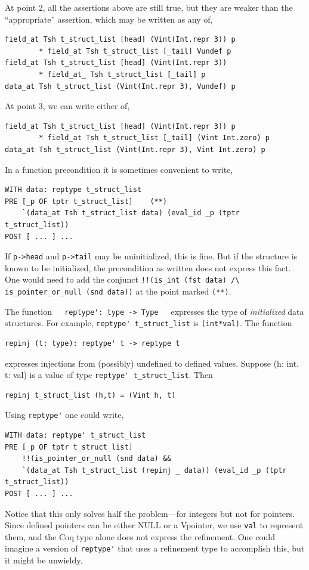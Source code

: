 \documentclass[12pt,fleqn,openany,oneside,showtrims]{memoir}
\begin{document}
At point 2, all the assertions above are still true, but
they are weaker than the ``appropriate'' assertion, which
may be written as any of,
\begin{lstlisting}
field_at Tsh t_struct_list [head] (Vint(Int.repr 3)) p
        * field_at Tsh t_struct_list [_tail] Vundef p
field_at Tsh t_struct_list [head] (Vint(Int.repr 3)) 
        * field_at_ Tsh t_struct_list [_tail] p
data_at Tsh t_struct_list (Vint(Int.repr 3), Vundef) p
\end{lstlisting}

At point 3, we can write either of,
\begin{lstlisting}
field_at Tsh t_struct_list [head] (Vint(Int.repr 3)) p 
        * field_at Tsh t_struct_list [_tail] (Vint Int.zero) p
data_at Tsh t_struct_list (Vint(Int.repr 3), Vint Int.zero) p
\end{lstlisting}


In a function precondition it is sometimes convenient to write,
\begin{lstlisting}
WITH data: reptype t_struct_list
PRE [_p OF tptr t_struct_list]    (**)  
    `(data_at Tsh t_struct_list data) (eval_id _p (tptr t_struct_list))
POST [ ... ] ...
\end{lstlisting}
If \lstinline{p->head} and 
\lstinline{p->tail} may be uninitialized, this is fine.
But if the structure is known to be initialized, the precondition
as written does not express this fact.  One would need to
add the conjunct \linebreak
\lstinline{!!(is_int (fst data) /\ is_pointer_or_null (snd data))}\linebreak
at the point marked \lstinline{(**)}.

The function~~~\lstinline{reptype': type -> Type}\ \ \ expresses
the type of \emph{initialized} data structures.  For example,
\lstinline{reptype' t_struct_list} is \lstinline{(int*val)}.
The function 
\begin{lstlisting}
repinj (t: type): reptype' t -> reptype t
\end{lstlisting}
expresses injections from (possibly) undefined to defined values.
Suppose (h: int, t: val) is a value of type 
\lstinline{reptype' t_struct_list}.  Then
\begin{lstlisting}
repinj t_struct_list (h,t) = (Vint h, t)
\end{lstlisting}

Using \lstinline{reptype'} one could write,
\begin{lstlisting}
WITH data: reptype' t_struct_list
PRE [_p OF tptr t_struct_list]
    !!(is_pointer_or_null (snd data) &&
    `(data_at Tsh t_struct_list (repinj _ data)) (eval_id _p (tptr t_struct_list))
POST [ ... ] ...
\end{lstlisting}
Notice that this only solves half the problem---for integers but not for
pointers.  Since defined pointers can be either NULL or a Vpointer,
we use \lstinline{val} to represent them, and the Coq type alone
does not express the refinement.  One could imagine 
a version of \lstinline{reptype'} that uses a refinement type
to accomplish this, but it might be unwieldy.
\end{document}

